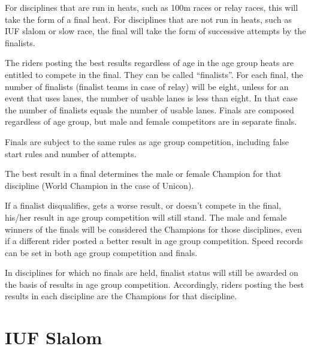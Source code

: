 For disciplines that are run in heats, such as 100m races or relay races, this will take the form of a final heat. 
For disciplines that are not run in heats, such as IUF slalom or slow race, the final will take the form of successive attempts by the finalists.

The riders posting the best results regardless of age in the age group heats are entitled to compete in the final.
They can be called ``finalists''.
For each final, the number of finalists (finalist teams in case of relay) will be eight, unless for an event that uses lanes, the number of usable lanes is less than eight.
In that case the number of finalists equals the number of usable lanes.
Finals are composed regardless of age group, but male and female competitors are in separate finals.

Finals are subject to the same rules as age group competition, including false start rules and number of attempts.

The best result in a final determines the male or female Champion for that discipline (World Champion in the case of Unicon).

If a finalist disqualifies, gets a worse result, or doesn’t compete in the final, his/her result in age group competition will still stand.
The male and female winners of the finals will be considered the Champions for those disciplines, even if a different rider posted a better result in age group competition.
Speed records can be set in both age group competition and finals.

In disciplines for which no finals are held, finalist status will still be awarded on the basis of results in age group competition.
Accordingly, riders posting the best results in each discipline are the Champions for that discipline.

\section{IUF Slalom}

